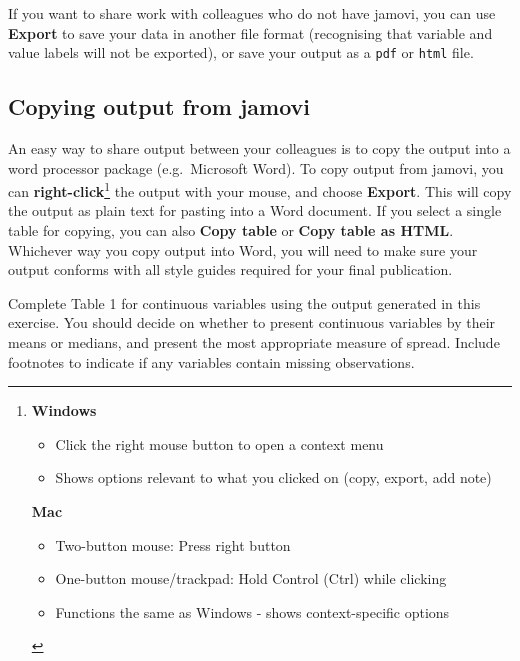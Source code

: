 \documentclass[
  a4paper,
]{memoir}
\providecommand{\tightlist}{%
  \setlength{\itemsep}{0pt}\setlength{\parskip}{0pt}}
\begin{document}
If you want to share work with colleagues who do not have jamovi, you
can use \textbf{Export} to save your data in another file format
(recognising that variable and value labels will not be exported), or
save your output as a \texttt{pdf} or \texttt{html} file.

\subsection{Copying output from
jamovi}\label{copying-output-from-jamovi}

An easy way to share output between your colleagues is to copy the
output into a word processor package (e.g.~Microsoft Word). To copy
output from jamovi, you can \textbf{right-click}\footnote{\textbf{Windows}

  \begin{itemize}
  \tightlist
  \item
    Click the right mouse button to open a context menu
  \item
    Shows options relevant to what you clicked on (copy, export, add
    note)
  \end{itemize}

  \textbf{Mac}

  \begin{itemize}
  \tightlist
  \item
    Two-button mouse: Press right button
  \item
    One-button mouse/trackpad: Hold Control (Ctrl) while clicking
  \item
    Functions the same as Windows - shows context-specific options
  \end{itemize}} the output with your mouse, and choose \textbf{Export}.
This will copy the output as plain text for pasting into a Word
document. If you select a single table for copying, you can also
\textbf{Copy table} or \textbf{Copy table as HTML}. Whichever way you
copy output into Word, you will need to make sure your output conforms
with all style guides required for your final publication.

\begin{tcolorbox}[enhanced jigsaw, arc=.35mm, bottomrule=.15mm, bottomtitle=1mm, breakable, colback=white, colbacktitle=quarto-callout-note-color!10!white, colframe=quarto-callout-note-color-frame, coltitle=black, left=2mm, leftrule=.75mm, opacityback=0, opacitybacktitle=0.6, rightrule=.15mm, title={TASK}, titlerule=0mm, toprule=.15mm, toptitle=1mm]

Complete Table 1 for continuous variables using the output generated in
this exercise. You should decide on whether to present continuous
variables by their means or medians, and present the most appropriate
measure of spread. Include footnotes to indicate if any variables
contain missing observations.

\end{tcolorbox}
\end{document}
